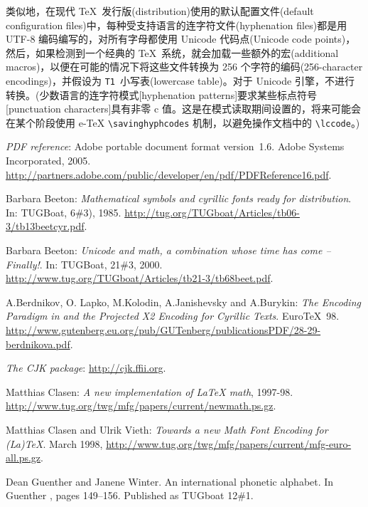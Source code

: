 \documentclass{ltxguide}[1994/11/20]
\providecommand{\Enc}[1]{\texttt{#1}}
\providecommand{\Pkg}[1]{%
  \textsf{#1}}
\begin{document}
类似地，在现代 \TeX\ 发行版(distribution)使用的默认配置文件(default configuration files)中，每种受支持语言的连字符文件(hyphenation files)都是用 UTF-8 编码编写的，对所有字母都使用 Unicode 代码点(Unicode code points)，然后，如果检测到一个经典的 \TeX\ 系统，就会加载一些额外的宏(additional macros)，以便在可能的情况下将这些文件转换为 256 个字符的编码(256-character encodings)，并假设为 \Enc{T1}\ 小写表(lowercase table)。对于 Unicode 引擎，不进行转换。(少数语言的连字符模式[hyphenation patterns]要求某些标点符号[punctuation characters]具有非零 c 值。这是在模式读取期间设置的，将来可能会在某个阶段使用 e-\TeX{} \verb=\savinghyphcodes= 机制，以避免操作文档中的 \verb=\lccode=。)


\begin{thebibliography}{99}


 \emph{\textsc{PDF} reference}:
    Adobe portable document format version~1.6.  Adobe Systems
    Incorporated, 2005. %
  \url{http://partners.adobe.com/public/developer/en/pdf/PDFReference16.pdf}.

 Barbara Beeton:
  \emph{Mathematical symbols and cyrillic fonts ready for
      distribution}.  In: TUGBoat, 6\#3), 1985.
  \url{http://tug.org/TUGboat/Articles/tb06-3/tb13beetcyr.pdf}.

 Barbara Beeton: \emph{Unicode
      and math, a combination whose time has come -- Finally!}.  In:
  TUGBoat, 21\#3, 2000.
  \url{http://www.tug.org/TUGboat/Articles/tb21-3/tb68beet.pdf}.


 A.\@ Berdnikov, O.\@
  Lapko, M.\@ Kolodin, A.\@ Janishevsky and
  A.\@ Burykin: \emph{The Encoding Paradigm in
      \LaTeXe{} and the Projected X2 Encoding for Cyrillic Texts}.
  Euro\TeX~98.
  \url{http://www.gutenberg.eu.org/pub/GUTenberg/publicationsPDF/28-29-berdnikova.pdf}.

 \emph{The \Pkg{CJK} package}:
  \url{http://cjk.ffii.org}.

 Matthias Clasen: \emph{A new
      implementation of \LaTeX{} math}, 1997-98.
  \url{http://www.tug.org/twg/mfg/papers/current/newmath.ps.gz}.

 Matthias Clasen and Ulrik
  Vieth: \emph{Towards a new Math Font Encoding
      for (La)\TeX}.  March 1998,
  \url{http://www.tug.org/twg/mfg/papers/current/mfg-euro-all.ps.gz}.

Dean Guenther and Janene Winter.
\newblock An international phonetic alphabet.
\newblock In Guenther \cite{proc:MGu91}, pages 149--156.
\newblock Published as {TUG}boat 12\#1.


\end{thebibliography}
\end{document}
